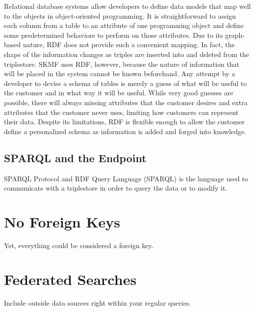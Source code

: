 Relational database systems allow developers to define data models that map well to the objects in object-oriented programming. It is straightforward to assign each column from a table to an attribute of one programming object and define some predetermined behaviors to perform on those attributes. Due to its graph-based nature, RDF does not provide such a convenient mapping. In fact, the shape of the information changes as triples are inserted into and deleted from the triplestore. SKMF uses RDF, however, because the nature of information that will be placed in the system cannot be known beforehand. Any attempt by a developer to devise a schema of tables is merely a guess of what will be useful to the customer and in what way it will be useful. While very good guesses are possible, there will always missing attributes that the customer desires and extra attributes that the customer never uses, limiting how customers can represent their data. Despite its limitations, RDF is flexible enough to allow the customer define a personalized schema as information is added and forged into knowledge.


\subsection{SPARQL and the Endpoint}

SPARQL Protocol and RDF Query Language (SPARQL) is the language used to communicate with a triplestore in order to query the data or to modify it.


\section{No Foreign Keys}

Yet, everything could be considered a foreign key.


\section{Federated Searches}

Include outside data sources right within your regular queries.
